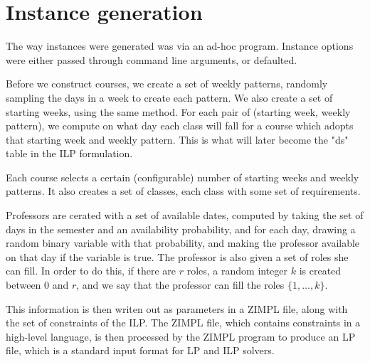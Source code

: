 \section{Instance generation}
\label{app:generate}

The way instances were generated was via an ad-hoc program. Instance options were either passed through command line arguments, or defaulted.

Before we construct courses, we create a set of weekly patterns, randomly sampling the days in a week to create each pattern. We also create a set of starting weeks, using the same method. For each pair of (starting week, weekly pattern), we compute on what day each class will fall for a course which adopts that starting week and weekly pattern. This is what will later become the "ds" table in the ILP formulation.

Each course selects a certain (configurable) number of starting weeks and weekly patterns. It also creates a set of classes, each class with some set of requirements.

Professors are cerated with a set of available dates, computed by taking the set of days in the semester and an availability probability, and for each day, drawing a random binary variable with that probability, and making the professor available on that day if the variable is true. The professor is also given a set of roles she can fill. In order to do this, if there are $r$ roles, a random integer $k$ is created between 0 and $r$, and we say that the professor can fill the roles $\{1, \dots, k\}$.

This information is then writen out as parameters in a ZIMPL\cite{Koch2004} file, along with the set of constraints of the ILP. The ZIMPL file, which contains constraints in a high-level language, is then processed by the ZIMPL program to produce an LP file, which is a standard input format for LP and ILP solvers.
